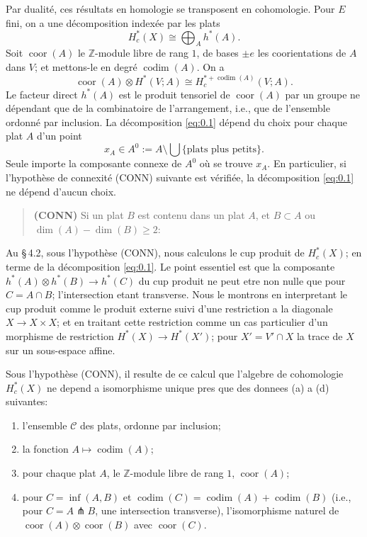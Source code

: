 \documentclass[11pt,a4paper]{article}
\theoremstyle{plain}
\theoremstyle{definition}
\DeclareMathOperator{\codim}{codim}
\newcommand{\coor}{\operatorname{coor}}
\begin{document}
Par dualit\'e, ces r\'esultats en homologie se transposent en cohomologie. Pour $E$ fini, on a une d\'ecomposition index\'ee par les plats
\begin{equation}\label{eq:0.1}
H^*_c(X) \cong \bigoplus_A h^*(A).
\tag{0.1}
\end{equation}
Soit $\coor(A)$ le $\mathbb{Z}$-module libre de rang $1$, de bases $\pm e$ les coorientations de $A$ dans $V$; et mettons-le en degr\'e $\codim(A)$. On a
\begin{equation}\label{eq:0.2}
\coor(A) \otimes H^*(V;A) \cong H^{*+\codim(A)}_c(V;A).
\tag{0.2}
\end{equation}
Le facteur direct $h^*(A)$ est le produit tensoriel de $\coor(A)$ par un groupe ne d\'ependant que de la combinatoire de l'arrangement, i.e., que de l'ensemble ordonn\'e par inclusion. La d\'ecomposition \eqref{eq:0.1} d\'epend du choix pour chaque plat $A$ d'un point
\[
x_A \in A^0 := A \setminus \bigcup\{\text{plats plus petits}\}.
\]
Seule importe la composante connexe de $A^0$ o\`u se trouve $x_A$. En particulier, si l'hypoth\`ese de connexit\'e (CONN) suivante est v\'erifi\'ee, la d\'ecomposition \eqref{eq:0.1} ne d\'epend d'aucun choix.

\begin{quote}
\textbf{(CONN)} \quad Si un plat $B$ est contenu dans un plat $A$, et $B \subset A$ ou $\dim(A) - \dim(B) \geq 2$:
\end{quote}

Au \S\,4.2, sous l'hypoth\`ese (CONN), nous calculons le cup produit de $H^*_c(X)$; en terme de la d\'ecomposition \eqref{eq:0.1}. Le point essentiel est que la composante $h^*(A) \otimes h^*(B) \to h^*(C)$ du cup produit ne peut etre non nulle que pour $C = A \cap B$; l'intersection etant transverse. Nous le montrons en interpretant le cup produit comme le produit externe suivi d'une restriction a la diagonale $X \to X \times X$; et en traitant cette restriction comme un cas particulier d'un morphisme de restriction $H^*(X) \to H^*(X')$; pour $X' = V' \cap X$ la trace de $X$ sur un sous-espace affine.

Sous l'hypoth\`ese (CONN), il resulte de ce calcul que l'algebre de cohomologie $H^*_c(X)$ ne depend a isomorphisme unique pres que des donnees (a) a (d) suivantes:
\begin{enumerate}[label=(\alph*)]
\item l'ensemble $\mathcal{C}$ des plats, ordonne par inclusion;
\item la fonction $A \mapsto \codim(A)$;
\item pour chaque plat $A$, le $\mathbb{Z}$-module libre de rang $1$, $\coor(A)$;
\item pour $C = \inf(A,B)$ et $\codim(C) = \codim(A) + \codim(B)$ (i.e., pour $C = A \pitchfork B$, une intersection transverse), l'isomorphisme naturel de $\coor(A) \otimes \coor(B)$ avec $\coor(C)$.
\end{enumerate}
\end{document}
